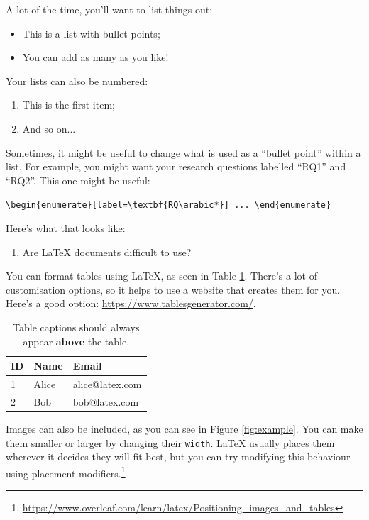 \documentclass[12pt,reqno,twoside]{amsbook}
\begin{document}
\noindent A lot of the time, you'll want to list things out:
\begin{itemize}
    \item This is a list with bullet points;
    \item You can add as many as you like!
\end{itemize}

\noindent Your lists can also be numbered:
\begin{enumerate}
    \item This is the first item;
    \item And so on...
\end{enumerate}

\noindent Sometimes, it might be useful to change what is used as a ``bullet point'' within a list. For example, you might want your research questions labelled ``RQ1'' and ``RQ2''. This one might be useful:

\begin{center}
    \verb|\begin{enumerate}[label=\textbf{RQ\arabic*}] ... \end{enumerate}|
\end{center}

\noindent Here's what that looks like:

\begin{enumerate}[label=\textbf{RQ\arabic*}] 
    \item Are LaTeX documents difficult to use?
\end{enumerate}

\noindent You can format tables using LaTeX, as seen in Table \ref{table:example}. There's a lot of customisation options, so it helps to use a website that creates them for you. Here's a good option: \url{https://www.tablesgenerator.com/}.

\begin{table}[h]
\caption{Table captions should always appear \textbf{above} the table.}
\begin{tabular}{l|l|l}
ID & Name  & Email           \\ \hline
1  & Alice & alice@latex.com \\
2  & Bob   & bob@latex.com  
\end{tabular}
\label{table:example}
\end{table}

Images can also be included, as you can see in Figure \ref{fig:example}. You can make them smaller or larger by changing their \texttt{width}. LaTeX usually places them wherever it decides they will fit best, but you can try modifying this behaviour using placement modifiers.\footnote{\url{https://www.overleaf.com/learn/latex/Positioning_images_and_tables}}
\end{document}
